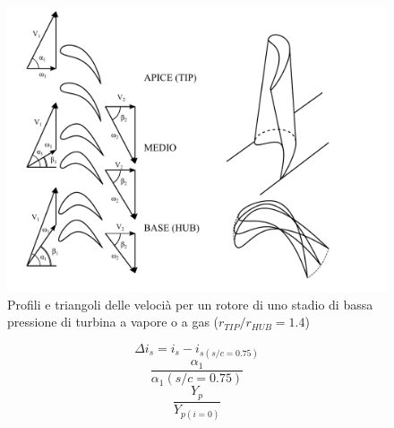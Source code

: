 \begin{figure}
\centering
  \includegraphics[width=.8\textwidth]{fig/TurbVortLib.pdf}
\caption{Profili e triangoli delle velocià per un rotore di uno stadio di bassa pressione di turbina a vapore o a gas ($r_{TIP}/r_{HUB} =1.4$)}
\label{fig:TurbVortLib}
\end{figure}

\begin{equation}
\Delta i_s = i_s - i_{s(s/c=0.75)}
\end{equation}
\begin{equation}
\frac{\alpha_1}{\alpha_1 (s/c = 0.75)}
\end{equation}
\begin{equation}
\frac{Y_p}{Y_{p(i=0)}}
\end{equation}